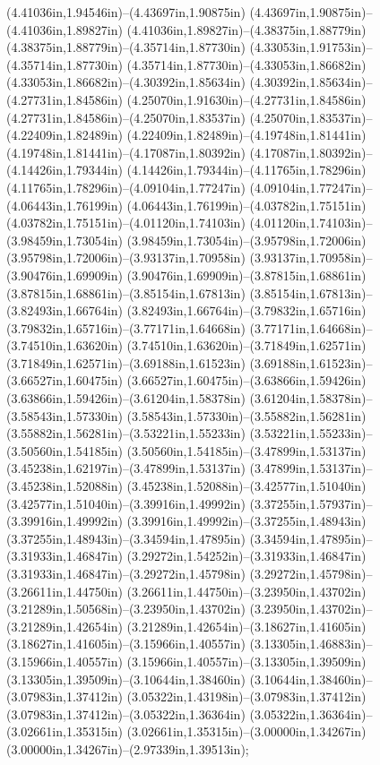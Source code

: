 (4.41036in,1.94546in)--(4.43697in,1.90875in) (4.43697in,1.90875in)--(4.41036in,1.89827in) (4.41036in,1.89827in)--(4.38375in,1.88779in) (4.38375in,1.88779in)--(4.35714in,1.87730in) (4.33053in,1.91753in)--(4.35714in,1.87730in) (4.35714in,1.87730in)--(4.33053in,1.86682in) (4.33053in,1.86682in)--(4.30392in,1.85634in) (4.30392in,1.85634in)--(4.27731in,1.84586in) (4.25070in,1.91630in)--(4.27731in,1.84586in) (4.27731in,1.84586in)--(4.25070in,1.83537in) (4.25070in,1.83537in)--(4.22409in,1.82489in) (4.22409in,1.82489in)--(4.19748in,1.81441in) (4.19748in,1.81441in)--(4.17087in,1.80392in) (4.17087in,1.80392in)--(4.14426in,1.79344in) (4.14426in,1.79344in)--(4.11765in,1.78296in) (4.11765in,1.78296in)--(4.09104in,1.77247in) (4.09104in,1.77247in)--(4.06443in,1.76199in) (4.06443in,1.76199in)--(4.03782in,1.75151in) (4.03782in,1.75151in)--(4.01120in,1.74103in) (4.01120in,1.74103in)--(3.98459in,1.73054in) (3.98459in,1.73054in)--(3.95798in,1.72006in) (3.95798in,1.72006in)--(3.93137in,1.70958in) (3.93137in,1.70958in)--(3.90476in,1.69909in) (3.90476in,1.69909in)--(3.87815in,1.68861in) (3.87815in,1.68861in)--(3.85154in,1.67813in) (3.85154in,1.67813in)--(3.82493in,1.66764in) (3.82493in,1.66764in)--(3.79832in,1.65716in) (3.79832in,1.65716in)--(3.77171in,1.64668in) (3.77171in,1.64668in)--(3.74510in,1.63620in) (3.74510in,1.63620in)--(3.71849in,1.62571in) (3.71849in,1.62571in)--(3.69188in,1.61523in) (3.69188in,1.61523in)--(3.66527in,1.60475in) (3.66527in,1.60475in)--(3.63866in,1.59426in) (3.63866in,1.59426in)--(3.61204in,1.58378in) (3.61204in,1.58378in)--(3.58543in,1.57330in) (3.58543in,1.57330in)--(3.55882in,1.56281in) (3.55882in,1.56281in)--(3.53221in,1.55233in) (3.53221in,1.55233in)--(3.50560in,1.54185in) (3.50560in,1.54185in)--(3.47899in,1.53137in) (3.45238in,1.62197in)--(3.47899in,1.53137in) (3.47899in,1.53137in)--(3.45238in,1.52088in) (3.45238in,1.52088in)--(3.42577in,1.51040in) (3.42577in,1.51040in)--(3.39916in,1.49992in) (3.37255in,1.57937in)--(3.39916in,1.49992in) (3.39916in,1.49992in)--(3.37255in,1.48943in) (3.37255in,1.48943in)--(3.34594in,1.47895in) (3.34594in,1.47895in)--(3.31933in,1.46847in) (3.29272in,1.54252in)--(3.31933in,1.46847in) (3.31933in,1.46847in)--(3.29272in,1.45798in) (3.29272in,1.45798in)--(3.26611in,1.44750in) (3.26611in,1.44750in)--(3.23950in,1.43702in) (3.21289in,1.50568in)--(3.23950in,1.43702in) (3.23950in,1.43702in)--(3.21289in,1.42654in) (3.21289in,1.42654in)--(3.18627in,1.41605in) (3.18627in,1.41605in)--(3.15966in,1.40557in) (3.13305in,1.46883in)--(3.15966in,1.40557in) (3.15966in,1.40557in)--(3.13305in,1.39509in) (3.13305in,1.39509in)--(3.10644in,1.38460in) (3.10644in,1.38460in)--(3.07983in,1.37412in) (3.05322in,1.43198in)--(3.07983in,1.37412in) (3.07983in,1.37412in)--(3.05322in,1.36364in) (3.05322in,1.36364in)--(3.02661in,1.35315in) (3.02661in,1.35315in)--(3.00000in,1.34267in) (3.00000in,1.34267in)--(2.97339in,1.39513in);
